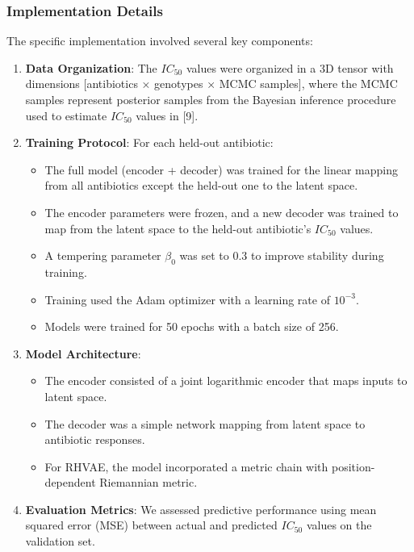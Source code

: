 \documentclass[
]{scrartcl}
\providecommand{\tightlist}{%
  \setlength{\itemsep}{0pt}\setlength{\parskip}{0pt}}
\begin{document}
\begin{refsection}
\subsubsection{Implementation Details}\label{implementation-details}

The specific implementation involved several key components:

\begin{enumerate}
\def\labelenumi{\arabic{enumi}.}
\item
  \textbf{Data Organization}: The \(IC_{50}\) values were organized in a
  3D tensor with dimensions {[}antibiotics × genotypes × MCMC
  samples{]}, where the MCMC samples represent posterior samples from
  the Bayesian inference procedure used to estimate \(IC_{50}\) values
  in {[}9{]}.
\item
  \textbf{Training Protocol}: For each held-out antibiotic:

  \begin{itemize}
  \tightlist
  \item
    The full model (encoder + decoder) was trained for the linear
    mapping from all antibiotics except the held-out one to the latent
    space.
  \item
    The encoder parameters were frozen, and a new decoder was trained to
    map from the latent space to the held-out antibiotic's \(IC_{50}\)
    values.
  \item
    A tempering parameter \(\beta_0\) was set to 0.3 to improve
    stability during training.
  \item
    Training used the Adam optimizer with a learning rate of
    \(10^{-3}\).
  \item
    Models were trained for 50 epochs with a batch size of 256.
  \end{itemize}
\item
  \textbf{Model Architecture}:

  \begin{itemize}
  \tightlist
  \item
    The encoder consisted of a joint logarithmic encoder that maps
    inputs to latent space.
  \item
    The decoder was a simple network mapping from latent space to
    antibiotic responses.
  \item
    For RHVAE, the model incorporated a metric chain with
    position-dependent Riemannian metric.
  \end{itemize}
\item
  \textbf{Evaluation Metrics}: We assessed predictive performance using
  mean squared error (MSE) between actual and predicted \(IC_{50}\)
  values on the validation set.
\end{enumerate}


\end{refsection}
\end{document}
